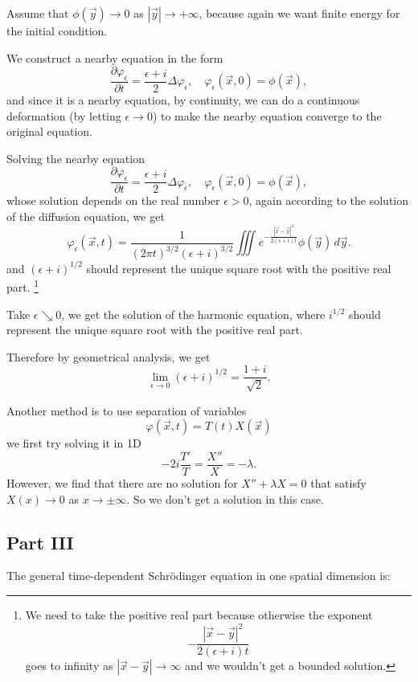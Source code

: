 \documentclass[a4paper,12pt]{report}
\begin{document}
Assume that $\phi(\vec{y}) \to 0$  as $|\vec{y}| \to +\infty$, because again we want finite energy for the initial condition. 

We construct a nearby equation in the form
\[
\frac{\partial \varphi_\epsilon}{\partial t} = \frac{\epsilon + i}{2} \Delta \varphi_\epsilon, \quad \varphi_\epsilon(\vec{x}, 0) = \phi(\vec{x}),
\]
and since it is a nearby equation, by continuity, we can do a continuous deformation (by letting \(\epsilon \to 0\)) to make the nearby equation converge to the original equation. 

Solving the nearby equation
\begin{equation}
\frac{\partial \varphi_\epsilon}{\partial t} = \frac{\epsilon + i}{2} \Delta \varphi_\epsilon, \quad \varphi_\epsilon(\vec{x}, 0) = \phi(\vec{x}), \tag{11}
\end{equation}
whose solution depends on the real number $\epsilon > 0$, again according to the solution of the diffusion equation, we get
\begin{equation}
\varphi_\epsilon(\vec{x}, t) = \frac{1}{(2\pi t)^{3/2}(\epsilon + i)^{3/2}} \iiint e^{-\frac{|\vec{x} - \vec{y}|^2}{2(\epsilon + i)t} } \phi(\vec{y}) \, d\vec{y}. \tag{12}
\end{equation}
and $(\epsilon + i)^{1/2}$ should represent the unique square root with the positive real part. \footnote{We need to take the positive real part because otherwise the exponent 
\[-\frac{|\vec{x} - \vec{y}|^2}{2(\epsilon + i)t} \]
goes to infinity as $|\vec{x} - \vec{y}| \to \infty$ and we wouldn’t get a bounded solution.}

Take $\epsilon \searrow 0$, we get the solution of the harmonic equation, where $i^{1/2}$ should represent the unique square root with the positive real part. 

Therefore by geometrical analysis, we get
\begin{equation*}
\lim_{\epsilon \to 0} (\epsilon + i)^{1/2} = \frac{1 + i}{\sqrt{2}}.
\end{equation*}

Another method is to use separation of variables
\[\varphi(\vec{x}, t) = T(t)X(\vec{x})\]
we first try solving it in 1D
\begin{equation}
-2i \frac{T'}{T} = \frac{X''}{X} = -\lambda. \tag{13}
\end{equation}
However, we find that there are no solution for $X'' + \lambda X = 0$ that satisfy $X(x) \to 0$ as $x \to \pm\infty$. So we don't get a solution in this case. 
\subsection{Part III}
\hspace*{1.5em}The general time-dependent Schrödinger equation in one spatial dimension is:
\end{document}
